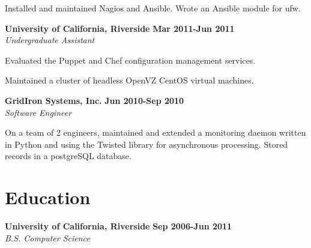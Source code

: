 \begin{lonelist}
\begin{innerlist}
  \item Installed and maintained Nagios and Ansible. Wrote an Ansible module
      for ufw.
  \end{innerlist}

\item[] \textbf{University of California, Riverside} \hfill \textbf{Mar 2011-Jun 2011}\\
  \textit{Undergraduate Assistant}
  \begin{innerlist}
  \item Evaluated the Puppet and Chef configuration management services.

  \item Maintained a cluster of headless OpenVZ CentOS virtual machines.
  \end{innerlist}

\item[] \textbf{GridIron Systems, Inc.} \hfill \textbf{Jun 2010-Sep 2010}\\
  \textit{Software Engineer}
  \begin{innerlist}
  \item On a team of 2 engineers, maintained and extended a monitoring daemon
      written in Python and using the Twisted library for asynchronous
      processing. Stored records in a postgreSQL database.
  \end{innerlist}

\end{lonelist}


\section{Education}
\textbf{University of California, Riverside} \hfill \textbf{Sep 2006-Jun 2011}\\
  \textit{B.S. Computer Science}
